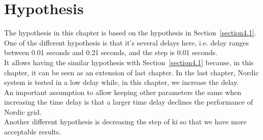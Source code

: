 \section{Hypothesis} %
The hypothesis in this chapter is based on the hypothesis in Section~\ref{section4.1}. \\
 
One of the different hypothesis is that it's several delays here, i.e. delay ranges between 0.01 seconds and 0.21 seconds, and the step is 0.01 seconds. \\

It allows having the similar hypothesis with Section~\ref{section4.1} because, in this chapter, it can be seen as an extension of last chapter. In the last chapter, Nordic system is tested in a low delay while, in this chapter, we increase the delay. \\

An important assumption to allow keeping other parameters the same when increasing the time delay is that a larger time delay declines the performance of Nordic grid. \\

Another different hypothesis is decreasing the step of ki so that we have more acceptable results. \\